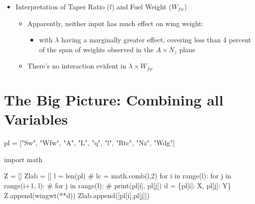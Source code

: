 \documentclass[
  letterpaper,
  DIV=11,
  numbers=noendperiod]{scrreprt}
\newenvironment{Shaded}{\begin{snugshade}}{\end{snugshade}}
\newcommand{\BuiltInTok}[1]{\textcolor[rgb]{0.00,0.23,0.31}{#1}}
\newcommand{\CommentTok}[1]{\textcolor[rgb]{0.37,0.37,0.37}{#1}}
\newcommand{\ControlFlowTok}[1]{\textcolor[rgb]{0.00,0.23,0.31}{#1}}
\newcommand{\DecValTok}[1]{\textcolor[rgb]{0.68,0.00,0.00}{#1}}
\newcommand{\ImportTok}[1]{\textcolor[rgb]{0.00,0.46,0.62}{#1}}
\newcommand{\KeywordTok}[1]{\textcolor[rgb]{0.00,0.23,0.31}{#1}}
\newcommand{\NormalTok}[1]{\textcolor[rgb]{0.00,0.23,0.31}{#1}}
\newcommand{\OperatorTok}[1]{\textcolor[rgb]{0.37,0.37,0.37}{#1}}
\newcommand{\StringTok}[1]{\textcolor[rgb]{0.13,0.47,0.30}{#1}}
\providecommand{\tightlist}{%
  \setlength{\itemsep}{0pt}\setlength{\parskip}{0pt}}\usepackage{longtable,booktabs,array}
\begin{document}
\begin{itemize}
\tightlist
\item
  Interpretation of Taper Ratio (\(l\)) and Fuel Weight (\(W_{fw}\))

  \begin{itemize}
  \tightlist
  \item
    Apparently, neither input has much effect on wing weight:

    \begin{itemize}
    \tightlist
    \item
      with \(\lambda\) having a marginally greater effect, covering less
      than 4 percent of the span of weights observed in the
      \(A \times N_z\) plane
    \end{itemize}
  \item
    There's no interaction evident in \(\lambda \times W_{fw}\)
  \end{itemize}
\end{itemize}

\hypertarget{the-big-picture-combining-all-variables}{%
\section{The Big Picture: Combining all
Variables}\label{the-big-picture-combining-all-variables}}

\begin{Shaded}
\begin{Highlighting}[]
\NormalTok{pl }\OperatorTok{=}\NormalTok{ [}\StringTok{"Sw"}\NormalTok{, }\StringTok{"Wfw"}\NormalTok{, }\StringTok{"A"}\NormalTok{, }\StringTok{"L"}\NormalTok{, }\StringTok{"q"}\NormalTok{, }\StringTok{"l"}\NormalTok{,  }\StringTok{"Rtc"}\NormalTok{, }\StringTok{"Nz"}\NormalTok{, }\StringTok{"Wdg"}\NormalTok{]}
\end{Highlighting}
\end{Shaded}

\begin{Shaded}
\begin{Highlighting}[]
\ImportTok{import}\NormalTok{ math}

\NormalTok{Z }\OperatorTok{=}\NormalTok{ []}
\NormalTok{Zlab }\OperatorTok{=}\NormalTok{ []}
\NormalTok{l }\OperatorTok{=} \BuiltInTok{len}\NormalTok{(pl)}
\CommentTok{\# lc = math.comb(l,2)}
\ControlFlowTok{for}\NormalTok{ i }\KeywordTok{in} \BuiltInTok{range}\NormalTok{(l):}
    \ControlFlowTok{for}\NormalTok{ j }\KeywordTok{in} \BuiltInTok{range}\NormalTok{(i}\OperatorTok{+}\DecValTok{1}\NormalTok{, l):}
    \CommentTok{\# for j in range(l):}
        \CommentTok{\# print(pl[i], pl[j])}
\NormalTok{        d }\OperatorTok{=}\NormalTok{ \{pl[i]: X, pl[j]: Y\}}
\NormalTok{        Z.append(wingwt(}\OperatorTok{**}\NormalTok{d))}
\NormalTok{        Zlab.append([pl[i],pl[j]])}
\end{Highlighting}
\end{Shaded}
\end{document}
